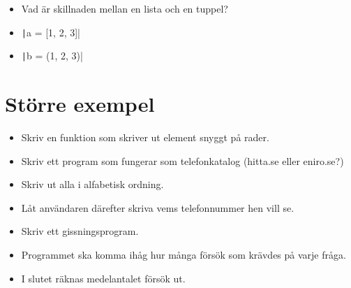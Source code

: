 \begin{frame}[fragile]
  \begin{exercise}
    \begin{itemize}
      \item Vad är skillnaden mellan en lista och en tuppel?
      \item \texttt|a = [1, 2, 3]|
      \item \texttt|b = (1, 2, 3)|
    \end{itemize}
  \end{exercise}
\end{frame}


\section{Större exempel}

\begin{frame}
  \begin{exercise}
    \begin{itemize}
      \item Skriv en funktion som skriver ut element snyggt på rader.
    \end{itemize}
  \end{exercise}
\end{frame}

\begin{frame}
  \begin{exercise}
    \begin{itemize}
      \item Skriv ett program som fungerar som telefonkatalog (hitta.se eller 
        eniro.se?)
      \item Skriv ut alla i alfabetisk ordning.
      \item Låt användaren därefter skriva vems telefonnummer hen vill se.
    \end{itemize}
  \end{exercise}
\end{frame}

\begin{frame}
  \begin{exercise}
    \begin{itemize}
      \item Skriv ett gissningsprogram.
      \item Programmet ska komma ihåg hur många försök som krävdes på varje 
        fråga.
      \item I slutet räknas medelantalet försök ut.
    \end{itemize}
  \end{exercise}
\end{frame}

